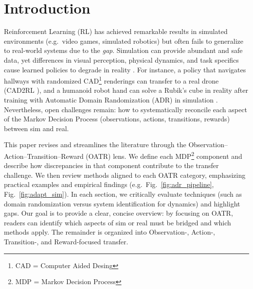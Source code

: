 \section{Introduction}
Reinforcement Learning (RL) has achieved remarkable results in simulated environments (e.g.\ video games, simulated robotics) but often fails to generalize to real-world systems due to the \emph{\simtoreal gap}. Simulation can provide abundant and safe data, yet differences in visual perception, physical dynamics, and task specifics cause learned policies to degrade in reality {\cite{Tobin2017,Sadeghi2017}}. For instance, a policy that navigates hallways with randomized CAD\footnote{CAD = Computer Aided Desing} renderings can transfer to a real drone (CAD2RL {\cite{Sadeghi2017}}), and a humanoid robot hand can solve a Rubik’s cube in reality after training with Automatic Domain Randomization (ADR) in simulation {\cite{Akkaya2019}}. Nevertheless, open challenges remain: how to systematically reconcile each aspect of the Markov Decision Process (observations, actions, transitions, rewards) between sim and real. 

This paper revises and streamlines the literature through the Observation–Action–Transition–Reward (OATR) lens. We define each MDP\footnote{MDP = Markov Decision Process} component and describe how discrepancies in that component contribute to the transfer challenge. We then review \simtoreal methods aligned to each OATR category, emphasizing practical examples and empirical findings (e.g.\ Fig.~\ref{fig:adr_pipeline}, Fig.~\ref{fig:adapt_sim}). In each section, we critically evaluate techniques (such as domain randomization versus system identification for dynamics) and highlight gaps. Our goal is to provide a clear, concise overview: by focusing on OATR, readers can identify which aspects of sim or real must be bridged and which methods apply. The remainder is organized into Observation-, Action-, Transition-, and Reward-focused transfer.
